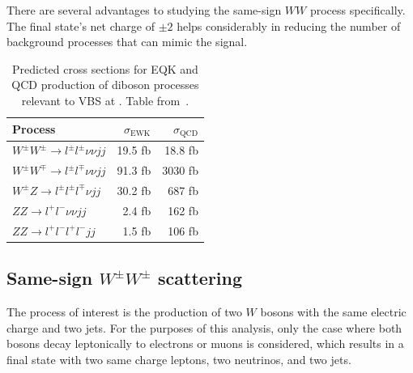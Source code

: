 There are several advantages to studying the same-sign $WW$ process specifically.
The final state's net charge of $\pm 2$ helps considerably in reducing the number of background processes that can mimic the signal.

\begin{table}[htbp]
  \centering
  \begin{tabular}{l r r}
    Process & $\sigma_{\textrm{EWK}}$ & $\sigma_{\textrm{QCD}}$ \\
    \hline\hline
    $W^{\pm}W^{\pm}\rightarrow l^{\pm}l^{\pm}\nu\nu jj$ & 19.5 fb & 18.8 fb \\
    $W^{\pm}W^{\mp}\rightarrow l^{\pm}l^{\mp}\nu\nu jj$ & 91.3 fb & 3030 fb \\
    $W^{\pm}Z\rightarrow l^{\pm}l^{\pm}l^{\mp}\nu jj$   & 30.2 fb & 687 fb  \\
    $ZZ\rightarrow l^{+}l^{-}\nu\nu jj$             & 2.4 fb  & 162 fb  \\
    $ZZ\rightarrow l^{+}l^{-}l^{+}l^{-} jj$           & 1.5 fb  & 106 fb \\
    \hline
  \end{tabular}
  \caption{Predicted cross sections for EQK and QCD production of diboson processes relevant to VBS at .  Table from~\cite{2013.ssww-8tev-atlas-support}.}
  \label{tab:ssww13tev_qcd_vs_ewk}
\end{table}

\subsection{Same-sign $W^{\pm}W^{\pm}$ scattering}\label{ssww13tev:ssww_topology}

The process of interest is the production of two $W$ bosons with the same electric charge and two jets.
For the purposes of this analysis, only the case where both bosons decay leptonically to electrons or muons is considered, which results in a final state with two same charge leptons, two neutrinos, and two jets.

